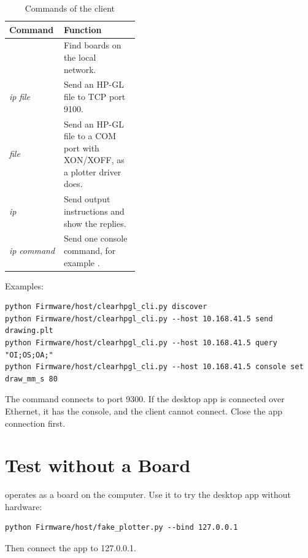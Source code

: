 \begin{table}[htbp]
\centering
\caption{Commands of the client}\label{tab:cli}
\begin{tabularx}{\linewidth}{@{}P{0.42\linewidth}L@{}}
\toprule
\textbf{Command} & \textbf{Function} \\
\midrule
{} & Find boards on the local network. \\
 \textit{ip}  \textit{file} & Send an HP-GL file to TCP port 9100. \\
 \textit{file} & Send an HP-GL file to a COM port with XON/XOFF, as a plotter driver does. \\
 \textit{ip}  & Send output instructions and show the replies. \\
 \textit{ip}  \textit{command} & Send one console command, for example . \\
\bottomrule
\end{tabularx}
\end{table}

Examples:

\begin{lstlisting}[language=console]
python Firmware/host/clearhpgl_cli.py discover
python Firmware/host/clearhpgl_cli.py --host 10.168.41.5 send drawing.plt
python Firmware/host/clearhpgl_cli.py --host 10.168.41.5 query "OI;OS;OA;"
python Firmware/host/clearhpgl_cli.py --host 10.168.41.5 console set draw_mm_s 80
\end{lstlisting}

\begin{note}
\notelabel The  command connects to port 9300. If the desktop
app is connected over Ethernet, it has the console, and the client cannot
connect. Close the app connection first.
\end{note}

\section{Test without a Board}

 operates as a board on the computer. Use
it to try the desktop app without hardware:

\begin{lstlisting}[language=console]
python Firmware/host/fake_plotter.py --bind 127.0.0.1
\end{lstlisting}

Then connect the app to 127.0.0.1.
